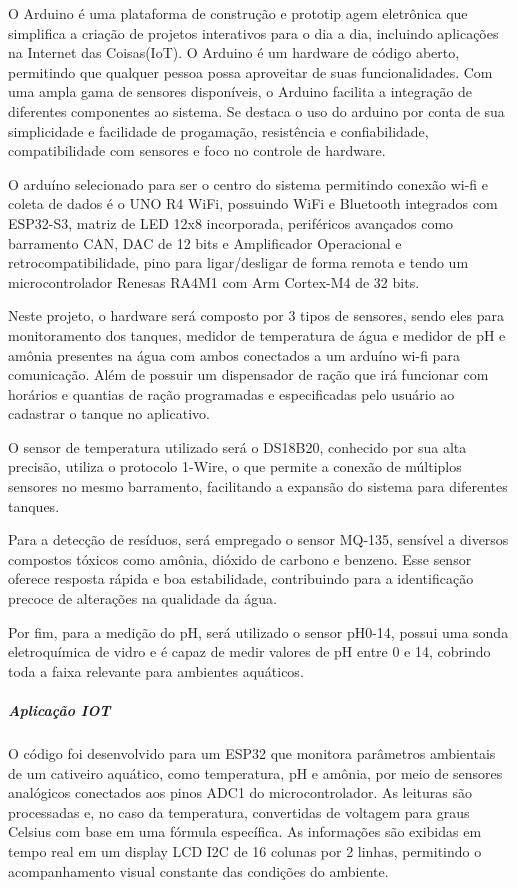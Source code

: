 O Arduino é uma plataforma de construção e prototip agem eletrônica que simplifica a criação de projetos interativos para o dia a dia, incluindo aplicações na Internet das Coisas(IoT). O Arduino é um hardware de código aberto, permitindo que qualquer pessoa possa aproveitar de suas funcionalidades. Com uma ampla gama de sensores disponíveis, o Arduino facilita a integração de diferentes componentes ao sistema\cite{thomsen2023}. Se destaca o uso do arduino por conta de sua simplicidade e facilidade de progamação, resistência e confiabilidade, compatibilidade com sensores e foco no controle de hardware.

O arduíno selecionado para ser o centro do sistema permitindo conexão wi-fi e coleta de dados é o UNO R4 WiFi, possuindo WiFi e Bluetooth integrados com ESP32-S3, matriz de LED 12x8 incorporada, periféricos avançados como barramento CAN, DAC de 12 bits e Amplificador Operacional e retrocompatibilidade, pino para ligar/desligar de forma remota e tendo um microcontrolador  Renesas RA4M1 com Arm Cortex-M4 de 32 bits.

Neste projeto, o hardware será composto por 3 tipos de sensores, sendo eles para monitoramento dos tanques, medidor de temperatura de água e medidor de pH e amônia presentes na água com ambos conectados a um arduíno wi-fi para comunicação. Além de possuir um dispensador de ração que irá funcionar com horários e quantias de ração programadas e especificadas pelo usuário ao cadastrar o tanque no aplicativo.

O sensor de temperatura utilizado será o DS18B20, conhecido por sua alta precisão, utiliza o protocolo 1-Wire, o que permite a conexão de múltiplos sensores no mesmo barramento, facilitando a expansão do sistema para diferentes tanques.

Para a detecção de resíduos, será empregado o sensor MQ-135, sensível a diversos compostos tóxicos como amônia, dióxido de carbono e benzeno. Esse sensor oferece resposta rápida e boa estabilidade, contribuindo para a identificação precoce de alterações na qualidade da água.

Por fim, para a medição do pH, será utilizado o sensor pH0-14, possui uma sonda eletroquímica de vidro e é capaz de medir valores de pH entre 0 e 14, cobrindo toda a faixa relevante para ambientes aquáticos.
 
\subparagraph*{\textbf{Aplicação IOT}}

O código foi desenvolvido para um ESP32 que monitora parâmetros ambientais de um cativeiro aquático, como temperatura, pH e amônia, por meio de sensores analógicos conectados aos pinos ADC1 do microcontrolador. As leituras são processadas e, no caso da temperatura, convertidas de voltagem para graus Celsius com base em uma fórmula específica. As informações são exibidas em tempo real em um display LCD I2C de 16 colunas por 2 linhas, permitindo o acompanhamento visual constante das condições do ambiente.

